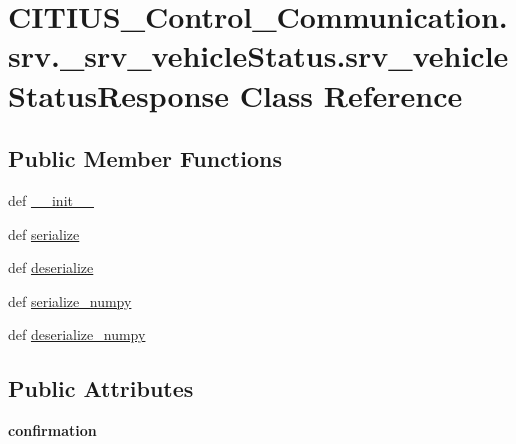 \hypertarget{class_c_i_t_i_u_s___control___communication_1_1srv_1_1__srv__vehicle_status_1_1srv__vehicle_status_response}{\section{\-C\-I\-T\-I\-U\-S\-\_\-\-Control\-\_\-\-Communication.\-srv.\-\_\-srv\-\_\-vehicle\-Status.\-srv\-\_\-vehicle\-Status\-Response \-Class \-Reference}
\label{class_c_i_t_i_u_s___control___communication_1_1srv_1_1__srv__vehicle_status_1_1srv__vehicle_status_response}
}
\subsection*{\-Public \-Member \-Functions}
\begin{DoxyCompactItemize}
\item 
def \hyperlink{class_c_i_t_i_u_s___control___communication_1_1srv_1_1__srv__vehicle_status_1_1srv__vehicle_status_response_a90b3b26f446b5b5428674b62cf033983}{\-\_\-\-\_\-init\-\_\-\-\_\-}
\item 
def \hyperlink{class_c_i_t_i_u_s___control___communication_1_1srv_1_1__srv__vehicle_status_1_1srv__vehicle_status_response_a028329b30eedd9af764730e5eecc7358}{serialize}
\item 
def \hyperlink{class_c_i_t_i_u_s___control___communication_1_1srv_1_1__srv__vehicle_status_1_1srv__vehicle_status_response_aaa264d3162af3d377c4da2c4bb5aafd4}{deserialize}
\item 
def \hyperlink{class_c_i_t_i_u_s___control___communication_1_1srv_1_1__srv__vehicle_status_1_1srv__vehicle_status_response_ab84cc2b31c1c76c50afda70f18510f1b}{serialize\-\_\-numpy}
\item 
def \hyperlink{class_c_i_t_i_u_s___control___communication_1_1srv_1_1__srv__vehicle_status_1_1srv__vehicle_status_response_a3f55ed79947f6071202e92841c56f7ed}{deserialize\-\_\-numpy}
\end{DoxyCompactItemize}
\subsection*{\-Public \-Attributes}
\begin{DoxyCompactItemize}
\item 
\hypertarget{class_c_i_t_i_u_s___control___communication_1_1srv_1_1__srv__vehicle_status_1_1srv__vehicle_status_response_aa4b0369c5217bec71d0355f65ed4732e}{{\bfseries confirmation}}\label{class_c_i_t_i_u_s___control___communication_1_1srv_1_1__srv__vehicle_status_1_1srv__vehicle_status_response_aa4b0369c5217bec71d0355f65ed4732e}

\end{DoxyCompactItemize}
